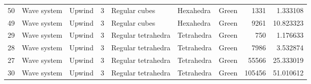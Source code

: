 \begin{tabular}{lllrlllrr}
50 &  Wave system &                            Upwind &               3 &                   Regular cubes &             Hexahedra  &      Green &                     1331 &                         1.333108 \\
49 &  Wave system &                            Upwind &               3 &                   Regular cubes &             Hexahedra  &      Green &                     9261 &                        10.823323 \\
29 &  Wave system &                            Upwind &               3 &              Regular tetrahedra &            Tetrahedra  &      Green &                      750 &                         1.176633 \\
28 &  Wave system &                            Upwind &               3 &              Regular tetrahedra &            Tetrahedra  &      Green &                     7986 &                         3.532874 \\
27 &  Wave system &                            Upwind &               3 &              Regular tetrahedra &            Tetrahedra  &      Green &                    55566 &                        25.333019 \\
30 &  Wave system &                            Upwind &               3 &              Regular tetrahedra &            Tetrahedra  &      Green &                   105456 &                        51.010612 \\
\bottomrule
\end{tabular}
